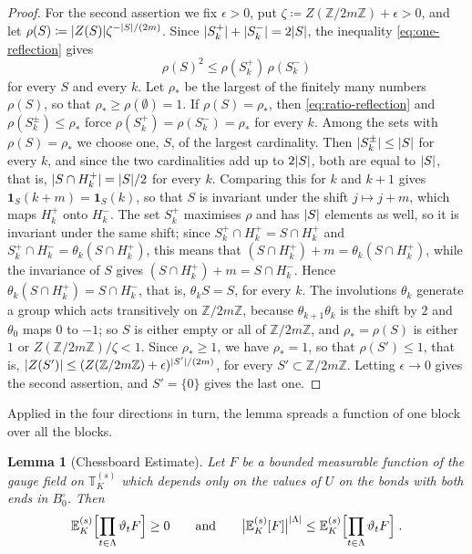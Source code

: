 \documentclass[11pt]{preprint}
\newcommand{\id}{\mathbf 1}
\DeclarePairedDelimiter{\abs}{\lvert}{\rvert}
\numberwithin{equation}{section}
\newtheorem{lemma}[theorem]{Lemma}
\theoremstyle{definition}
\theoremstyle{remark}
\theoremstyle{plain}
\begin{document}
\begin{proof}
For the second assertion we fix $\epsilon > 0$, put $\zeta \coloneqq Z(\mathbb Z/2m\mathbb Z) + \epsilon > 0$, and let $\rho(S) \coloneqq \abs{Z(S)}\zeta^{-\abs{S}/(2m)}$. Since $\abs{S^+_k} + \abs{S^-_k} = 2\abs{S}$, the inequality \eqref{eq:one-reflection} gives
\begin{equation}\label{eq:ratio-reflection}
    \rho(S)^2 \leq \rho(S^+_k)\,\rho(S^-_k)
\end{equation}
for every $S$ and every $k$. Let $\rho_*$ be the largest of the finitely many numbers $\rho(S)$, so that $\rho_* \geq \rho(\emptyset) = 1$. If $\rho(S) = \rho_*$, then \eqref{eq:ratio-reflection} and $\rho(S^\pm_k) \leq \rho_*$ force $\rho(S^+_k) = \rho(S^-_k) = \rho_*$ for every $k$. Among the sets with $\rho(S) = \rho_*$ we choose one, $S$, of the largest cardinality. Then $\abs{S^\pm_k} \leq \abs{S}$ for every $k$, and since the two cardinalities add up to $2\abs{S}$, both are equal to $\abs{S}$, that is, $\abs{S \cap H^+_k} = \abs{S}/2$ for every $k$. Comparing this for $k$ and $k + 1$ gives $\id_S(k + m) = \id_S(k)$, so that $S$ is invariant under the shift $j \mapsto j + m$, which maps $H^+_k$ onto $H^-_k$. The set $S^+_k$ maximises $\rho$ and has $\abs{S}$ elements as well, so it is invariant under the same shift; since $S^+_k \cap H^+_k = S \cap H^+_k$ and $S^+_k \cap H^-_k = \theta_k(S \cap H^+_k)$, this means that $(S \cap H^+_k) + m = \theta_k(S \cap H^+_k)$, while the invariance of $S$ gives $(S \cap H^+_k) + m = S \cap H^-_k$. Hence $\theta_k(S \cap H^+_k) = S \cap H^-_k$, that is, $\theta_kS = S$, for every $k$. The involutions $\theta_k$ generate a group which acts transitively on $\mathbb Z/2m\mathbb Z$, because $\theta_{k+1}\theta_k$ is the shift by $2$ and $\theta_0$ maps $0$ to $-1$; so $S$ is either empty or all of $\mathbb Z/2m\mathbb Z$, and $\rho_* = \rho(S)$ is either $1$ or $Z(\mathbb Z/2m\mathbb Z)/\zeta < 1$. Since $\rho_* \geq 1$, we have $\rho_* = 1$, so that $\rho(S') \leq 1$, that is, $\abs{Z(S')} \leq (Z(\mathbb Z/2m\mathbb Z) + \epsilon)^{\abs{S'}/(2m)}$, for every $S' \subset \mathbb Z/2m\mathbb Z$. Letting $\epsilon \to 0$ gives the second assertion, and $S' = \{ 0 \}$ gives the last one.
\end{proof}

Applied in the four directions in turn, the lemma spreads a function of one block over all the blocks.

\begin{lemma}[Chessboard Estimate]\label{lem:chessboard}
Let $F$ be a bounded measurable function of the gauge field on $\mathbb T^{(s)}_K$ which depends only on the values of $U$ on the bonds with both ends in $B^\circ_0$. Then
\begin{equation}\label{eq:chessboard}
    \mathbb E^{(s)}_K\Bigl[\prod_{t \in \Lambda}\vartheta_tF\Bigr] \geq 0
    \qquad\text{and}\qquad
    \bigl\lvert\mathbb E^{(s)}_K[F]\bigr\rvert^{\abs{\Lambda}} \leq \mathbb E^{(s)}_K\Bigl[\prod_{t \in \Lambda}\vartheta_tF\Bigr]\;.
\end{equation}
\end{lemma}
\end{document}
